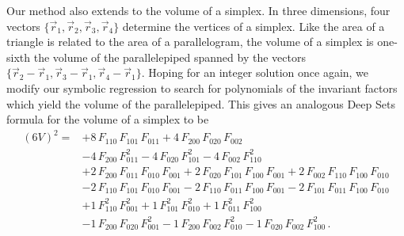 \documentclass[12pt]{article}
\begin{document}
Our method also extends to the volume of a simplex. In three dimensions, four vectors $\{ \vec{r}_1, \vec{r}_2, \vec{r}_3, \vec{r}_4 \}$ determine the vertices of a simplex. 
Like the area of a triangle is related to the area of a parallelogram, the volume of a simplex is one-sixth the volume of the parallelepiped spanned by the vectors $\{ \vec{r}_2 - \vec{r}_1, \vec{r}_3 - \vec{r}_1, \vec{r}_4 - \vec{r}_1 \}$. Hoping for an integer solution once again, we modify our symbolic regression to search for polynomials of the invariant factors which yield the volume of the parallelepiped. This gives an analogous Deep Sets formula for the volume of a simplex to be
\begin{align}
(6 V)^2 = &
+8 \, F_{110} \, F_{101} \, F_{011}
+4 \, F_{200} \, F_{020} \, F_{002}
\nonumber \\ &
-4 \, F_{200} \, F_{011}^2
-4 \, F_{020} \, F_{101}^2
-4 \, F_{002} \, F_{110}^2
\nonumber \\ &
+2 \, F_{200} \, F_{011} \, F_{010} \, F_{001}
+2 \, F_{020} \, F_{101} \, F_{100} \, F_{001}
+2 \, F_{002} \, F_{110} \, F_{100} \, F_{010}
\nonumber \\ &
-2 \, F_{110} \, F_{101} \, F_{010} \, F_{001}
-2 \, F_{110} \, F_{011} \, F_{100} \, F_{001}
-2 \, F_{101} \, F_{011} \, F_{100} \, F_{010}
\nonumber \\ &
+1 \, F_{110}^2 \, F_{001}^2
+1 \, F_{101}^2 \, F_{010}^2
+1 \, F_{011}^2 \, F_{100}^2
\nonumber \\ &
-1 \, F_{200} \, F_{020} \, F_{001}^2
-1 \, F_{200} \, F_{002} \, F_{010}^2
-1 \, F_{020} \, F_{002} \, F_{100}^2 \, .
\label{eq:simplex}
\end{align}

\end{document}
